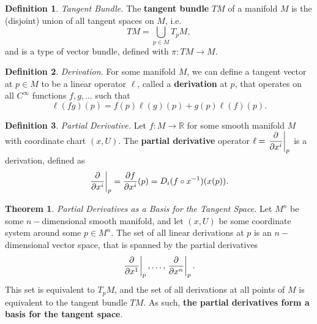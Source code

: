 \documentclass[10pt,landscape]{article}
\theoremstyle{definition}
\newtheorem{definition}{Definition}[section]
\theoremstyle{theorem}
\newtheorem{theorem}{Theorem}[section]
\theoremstyle{summary}
\theoremstyle{remark}
\newcommand{\R}{\mathbb{R}}
\newcommand{\Ci}{C^\infty}
\begin{document}
\begin{multicols*}{3}
\theoremstyle{definition}
\begin{definition}{\textit{Tangent Bundle.}}
    The \textbf{tangent bundle} $TM$ of a manifold $M$ is the (disjoint) union of all tangent spaces on $M$, i.e.
    \begin{equation}
        TM = \bigcup_{p\in M}T_pM,
    \end{equation}
    and is a type of vector bundle, defined with $\pi: TM \rightarrow M$.
\end{definition}

\theoremstyle{definition}
\begin{definition}{\textit{Derivation.}}
    For some manifold $M$, we can define a tangent vector at $p\in M$ to be a linear operator $\ell$, called a \textbf{derivation} at $p$, that operates on all $\Ci$ functions $f,g,\ldots$ such that
    \begin{equation}
        \ell(fg)(p) = f(p)\ell(g)(p) + g(p)\ell(f)(p).
    \end{equation}
\end{definition}

\theoremstyle{definition}
\begin{definition}{\textit{Partial Derivative.}}
   Let $f:M\rightarrow \R$ for some smooth manifold $M$ with coordinate chart $(x,U)$. The \textbf{partial derivative} operator $\ell = \displaystyle\left.\pdv{}{x^i}\right|_p$ is a derivation, defined as
   \begin{equation}
    \displaystyle\left.\pdv{}{x^i}\right|_p = {\pdv{f}{x^i}} (p) = D_i(f\circ x^{-1})(x(p)).
   \end{equation}
\end{definition}

\theoremstyle{theorem}
\begin{theorem}{\textit{Partial Derivatives as a Basis for the Tangent Space.}}
\label{thm_partialbases}
   Let $M^n$ be some $n-$dimensional smooth manifold, and let $(x,U)$ be some coordinate system around some $p\in M^n$. The set of all linear derivations at $p$ is an $n-$dimensional vector space, that is spanned by
   the partial derivatives
   \begin{equation}
    \displaystyle\left.\pdv{}{x^1}\right|_p,\ldots,\displaystyle\left.\pdv{}{x^n}\right|_p.
   \end{equation}
   This set is equivalent to $T_pM$, and the set of all derivations at all points of $M$ is equivalent to the tangent bundle $TM$. As such, \textbf{the partial derivatives form a basis for the tangent space}.
\end{theorem}


\end{multicols*}
\end{document}
